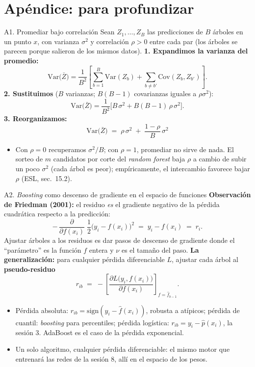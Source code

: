 \documentclass{beamer}
\newcommand{\Var}{\mathrm{Var}}
\newcommand{\Cov}{\mathrm{Cov}}
\newcommand{\1}{\mathbb{I}}
\begin{document}
\section{Apéndice: para profundizar}
\begin{frame}[noframenumbering]
\tableofcontents[currentsection]
\end{frame}

\begin{frame}{A1. Promediar bajo correlación}
\small
Sean $Z_1, \ldots, Z_B$ las predicciones de $B$ árboles en un punto $x$, con varianza $\sigma^2$ y correlación $\rho > 0$ entre cada par (los árboles se parecen porque salieron de los mismos datos).
\pause
\textbf{1. Expandimos la varianza del promedio:}
\[ \Var\big( \bar{Z} \big) = \frac{1}{B^2} \left[ \sum_{b=1}^{B} \Var(Z_b) + \sum_{b \neq b'} \Cov(Z_b, Z_{b'}) \right]. \]
\pause
\textbf{2. Sustituimos} ($B$ varianzas; $B(B-1)$ covarianzas iguales a $\rho\sigma^2$):
\[ \Var\big( \bar{Z} \big) = \frac{1}{B^2} \Big[ B\,\sigma^2 + B(B-1)\,\rho\,\sigma^2 \Big]. \]
\pause
\textbf{3. Reorganizamos:}
\[ \boxed{ \; \Var\big( \bar{Z} \big) \;=\; \rho\,\sigma^2 \;+\; \frac{1-\rho}{B}\,\sigma^2 \; } \]
\pause
\begin{itemize}\itemsep2pt
  \item Con $\rho = 0$ recuperamos $\sigma^2/B$; con $\rho = 1$, promediar no sirve de nada. El sorteo de $m$ candidatos por corte del \emph{random forest} baja $\rho$ a cambio de subir un poco $\sigma^2$ (cada árbol es peor); empíricamente, el intercambio favorece bajar $\rho$ (ESL, sec.\ 15.2).
\end{itemize}
\end{frame}

\begin{frame}{A2. \emph{Boosting} como descenso de gradiente en el espacio de funciones}
\small
\textbf{Observación de Friedman (2001):} el residuo \emph{es} el gradiente negativo de la pérdida cuadrática respecto a la predicción:
\[ -\,\frac{\partial}{\partial f(x_i)} \; \frac{1}{2}\big( y_i - f(x_i) \big)^2 \;=\; y_i - f(x_i) \;=\; r_i. \]
Ajustar árboles a los residuos es dar pasos de descenso de gradiente donde el ``parámetro'' es la función $f$ entera y $\nu$ es el tamaño del paso.
\pause
\vspace{0.05cm}
\textbf{La generalización:} para cualquier pérdida diferenciable $L$, ajustar cada árbol al \textbf{pseudo-residuo}
\[ r_{ib} \;=\; -\left[ \frac{\partial L\big(y_i, f(x_i)\big)}{\partial f(x_i)} \right]_{f = \hat{f}_{b-1}}. \]
\pause
\begin{itemize}\itemsep1pt
  \item Pérdida absoluta: $r_{ib} = \mathrm{sign}(y_i - \hat{f}(x_i))$, robusta a atípicos; pérdida de cuantil: \emph{boosting} para percentiles; pérdida logística: $r_{ib} = y_i - \hat{p}(x_i)$, la sesión 3. AdaBoost es el caso de la pérdida exponencial.
  \item Un solo algoritmo, cualquier pérdida diferenciable: el mismo motor que entrenará las redes de la sesión 8, allí en el espacio de los pesos.
\end{itemize}
\end{frame}
\end{document}
